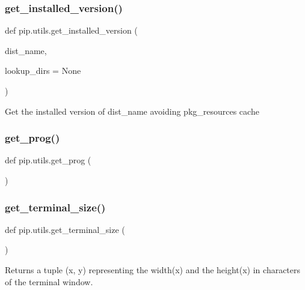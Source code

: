 \subsubsection{\texorpdfstring{get\+\_\+installed\+\_\+version()}{get\_installed\_version()}}
{\footnotesize\ttfamily def pip.\+utils.\+get\+\_\+installed\+\_\+version (\begin{DoxyParamCaption}\item[{}]{dist\+\_\+name,  }\item[{}]{lookup\+\_\+dirs = {\ttfamily None} }\end{DoxyParamCaption})}

\begin{DoxyVerb}Get the installed version of dist_name avoiding pkg_resources cache\end{DoxyVerb}
 \mbox{\label{namespacepip_1_1utils_a136ecb41887e8532d27179c39407614c}} 
\subsubsection{\texorpdfstring{get\+\_\+prog()}{get\_prog()}}
{\footnotesize\ttfamily def pip.\+utils.\+get\+\_\+prog (\begin{DoxyParamCaption}{ }\end{DoxyParamCaption})}

\mbox{\label{namespacepip_1_1utils_a8de6d6632766e3b204fa25bc86eb4762}} 
\subsubsection{\texorpdfstring{get\+\_\+terminal\+\_\+size()}{get\_terminal\_size()}}
{\footnotesize\ttfamily def pip.\+utils.\+get\+\_\+terminal\+\_\+size (\begin{DoxyParamCaption}{ }\end{DoxyParamCaption})}

\begin{DoxyVerb}Returns a tuple (x, y) representing the width(x) and the height(x)
in characters of the terminal window.\end{DoxyVerb}
 \mbox{\label{namespacepip_1_1utils_a7d54e83fa5ef04195ba6b6857a509843}} 
